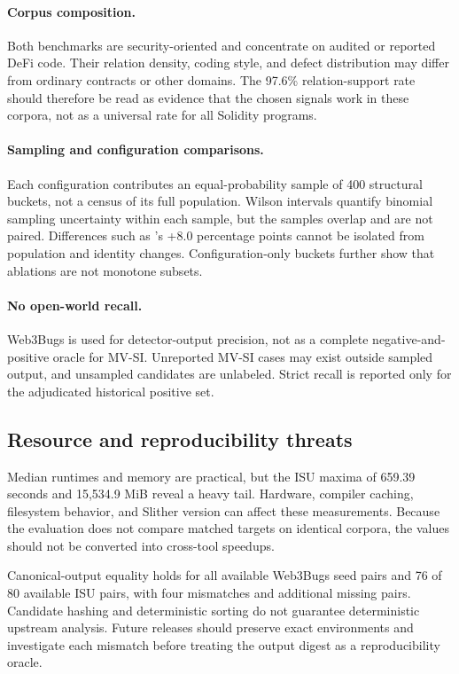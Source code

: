 \paragraph{Corpus composition.}
Both benchmarks are security-oriented and concentrate on audited or reported DeFi code. Their relation density, coding style, and defect distribution may differ from ordinary contracts or other domains. The 97.6\% relation-support rate should therefore be read as evidence that the chosen signals work in these corpora, not as a universal rate for all Solidity programs.

\paragraph{Sampling and configuration comparisons.}
Each configuration contributes an equal-probability sample of 400 structural buckets, not a census of its full population. Wilson intervals quantify binomial sampling uncertainty within each sample, but the samples overlap and are not paired. Differences such as 's +8.0 percentage points cannot be isolated from population and identity changes. Configuration-only buckets further show that ablations are not monotone subsets.

\paragraph{No open-world recall.}
Web3Bugs is used for detector-output precision, not as a complete negative-and-positive oracle for MV-SI. Unreported MV-SI cases may exist outside sampled output, and unsampled candidates are unlabeled. Strict recall is reported only for the adjudicated historical positive set.

\subsection{Resource and reproducibility threats}
\label{s:limitations-resources}

Median runtimes and memory are practical, but the ISU maxima of 659.39 seconds and 15,534.9 MiB reveal a heavy tail. Hardware, compiler caching, filesystem behavior, and Slither version can affect these measurements. Because the evaluation does not compare matched targets on identical corpora, the values should not be converted into cross-tool speedups.

Canonical-output equality holds for all available Web3Bugs seed pairs and 76 of 80 available ISU pairs, with four mismatches and additional missing pairs. Candidate hashing and deterministic sorting do not guarantee deterministic upstream analysis. Future releases should preserve exact environments and investigate each mismatch before treating the output digest as a reproducibility oracle.

